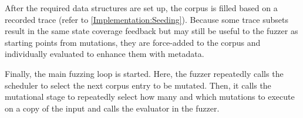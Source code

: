 \documentclass[twocolumn]{article}
\newcommand{\code}[2][]{\lstinline[language=#1, breaklines=false, basicstyle=\ttfamily]{#2}}
\let\savedCite=\cite
\renewcommand{\cite}{\unskip~\savedCite}
\begin{document}

After the required data structures are set up, the corpus is filled based on a recorded trace (refer to \cref{Implementation:Seeding}). Because some trace subsets result in the same state coverage feedback but may still be useful to the fuzzer as starting points from mutations, they are force-added to the corpus and individually evaluated to enhance them with metadata.

Finally, the main fuzzing loop is started. Here, the fuzzer repeatedly calls the scheduler to select the next corpus entry to be mutated. Then, it calls the mutational stage to repeatedly select how many and which mutations to execute on a copy of the input and calls the evaluator in the fuzzer.
\end{document}
